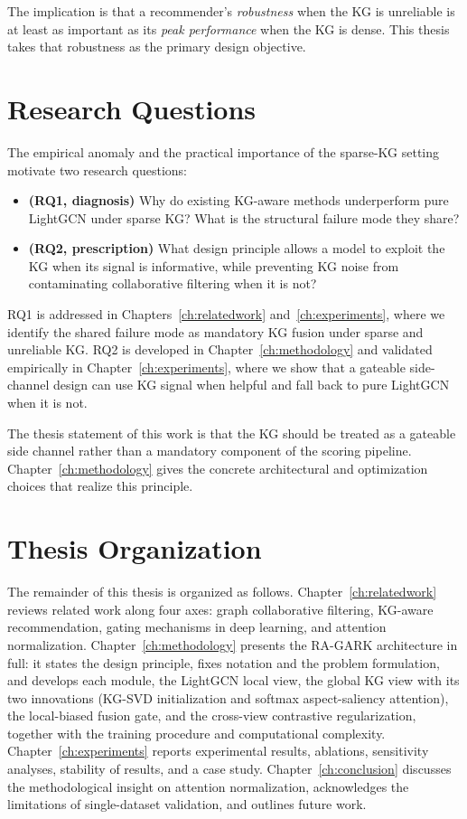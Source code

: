 The implication is that a recommender's \emph{robustness} when the KG is unreliable is at least as important as its \emph{peak performance} when the KG is dense. This thesis takes that robustness as the primary design objective.

\section{Research Questions}
\label{sec:intro-rq}

The empirical anomaly and the practical importance of the sparse-KG setting motivate two research questions:

\begin{itemize}
  \item \textbf{(RQ1, diagnosis)} Why do existing KG-aware methods underperform pure LightGCN under sparse KG? What is the structural failure mode they share?
  \item \textbf{(RQ2, prescription)} What design principle allows a model to exploit the KG when its signal is informative, while preventing KG noise from contaminating collaborative filtering when it is not?
\end{itemize}

RQ1 is addressed in Chapters~\ref{ch:relatedwork} and~\ref{ch:experiments}, where we identify the shared failure mode as mandatory KG fusion under sparse and unreliable KG. RQ2 is developed in Chapter~\ref{ch:methodology} and validated empirically in Chapter~\ref{ch:experiments}, where we show that a gateable side-channel design can use KG signal when helpful and fall back to pure LightGCN when it is not.

The thesis statement of this work is that the KG should be treated as a gateable side channel rather than a mandatory component of the scoring pipeline. Chapter~\ref{ch:methodology} gives the concrete architectural and optimization choices that realize this principle.

\section{Thesis Organization}
\label{sec:intro-organization}

The remainder of this thesis is organized as follows. Chapter~\ref{ch:relatedwork} reviews related work along four axes: graph collaborative filtering, KG-aware recommendation, gating mechanisms in deep learning, and attention normalization. Chapter~\ref{ch:methodology} presents the RA-GARK architecture in full: it states the design principle, fixes notation and the problem formulation, and develops each module, the LightGCN local view, the global KG view with its two innovations (KG-SVD initialization and softmax aspect-saliency attention), the local-biased fusion gate, and the cross-view contrastive regularization, together with the training procedure and computational complexity. Chapter~\ref{ch:experiments} reports experimental results, ablations, sensitivity analyses, stability of results, and a case study. Chapter~\ref{ch:conclusion} discusses the methodological insight on attention normalization, acknowledges the limitations of single-dataset validation, and outlines future work.

